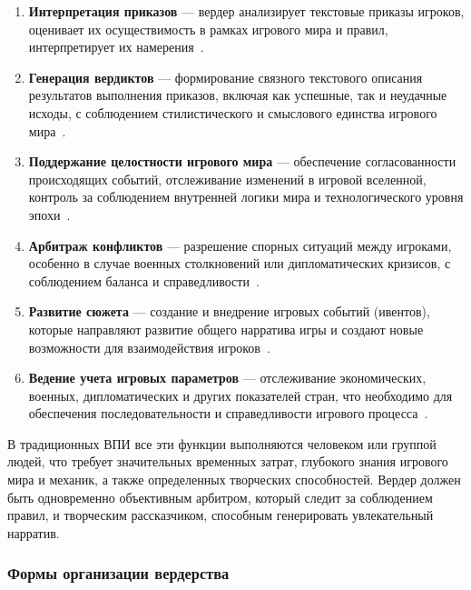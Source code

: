 \begin{enumerate}
    \item \textbf{Интерпретация приказов} — вердер анализирует текстовые приказы игроков, оценивает их осуществимость в рамках игрового мира и правил, интерпретирует их намерения~\cite{rpg-gamemaster}.

    \item \textbf{Генерация вердиктов} — формирование связного текстового описания результатов выполнения приказов, включая как успешные, так и неудачные исходы, с соблюдением стилистического и смыслового единства игрового мира~\cite{wpg-glossary}.

    \item \textbf{Поддержание целостности игрового мира} — обеспечение согласованности происходящих событий, отслеживание изменений в игровой вселенной, контроль за соблюдением внутренней логики мира и технологического уровня эпохи~\cite{dtf2021}.

    \item \textbf{Арбитраж конфликтов} — разрешение спорных ситуаций между игроками, особенно в случае военных столкновений или дипломатических кризисов, с соблюдением баланса и справедливости~\cite{rpg-gamemaster}.

    \item \textbf{Развитие сюжета} — создание и внедрение игровых событий (ивентов), которые направляют развитие общего нарратива игры и создают новые возможности для взаимодействия игроков~\cite{narratology-games}.

    \item \textbf{Ведение учета игровых параметров} — отслеживание экономических, военных, дипломатических и других показателей стран, что необходимо для обеспечения последовательности и справедливости игрового процесса~\cite{wpg-dtf}.
\end{enumerate}

В традиционных ВПИ все эти функции выполняются человеком или группой людей, что требует значительных временных затрат, глубокого знания игрового мира и механик, а также определенных творческих способностей. Вердер должен быть одновременно объективным арбитром, который следит за соблюдением правил, и творческим рассказчиком, способным генерировать увлекательный нарратив.

\subsubsection{Формы организации вердерства}

